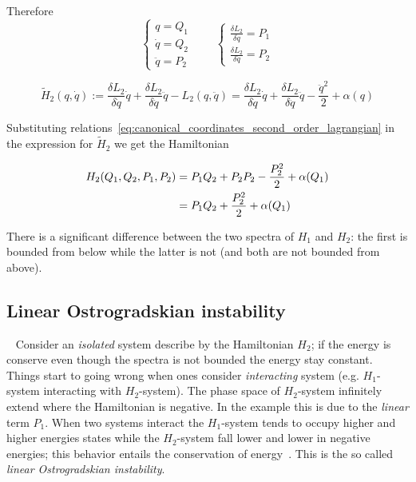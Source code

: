 Therefore
\begin{equation}\label{eq:canonical_coordinates_second_order_lagrangian}
  \begin{cases}
    q        = Q_1 \\
    \dot{q}  = Q_2 \\
    \ddot{q} = P_2
  \end{cases}
  \qquad
  \begin{cases}
    \frac{\delta L_2}{\delta \dot{q}}  = P_1 \\
    \frac{\delta L_2}{\delta \ddot{q}} = P_2
  \end{cases}
\end{equation}

\begin{equation*}
  \tilde{H}_2(q, \dot{q}) :=
    \frac{\delta L_2}{\delta \dot{q}} \dot{q} +
    \frac{\delta L_2}{\delta \ddot{q}} \ddot{q} -
    L_2(q, \ddot{q})
    = \frac{\delta L_2}{\delta \dot{q}} \dot{q} +
    \frac{\delta L_2}{\delta \ddot{q}} \ddot{q} -
    \frac{\ddot{q}^2}{2} + \alpha(q)
\end{equation*}

Substituting relations~\eqref{eq:canonical_coordinates_second_order_lagrangian}
in the expression for $\tilde{H}_2$ we get the Hamiltonian

\begin{align} \label{eq: second-order_motion_eq_ham}
  H_2(Q_1, Q_2, P_1, P_2)
    &= P_1 Q_2 + P_2 P_2 - \frac{P_2^2}{2} + \alpha(Q_1) \notag \\
    &= P_1 Q_2 + \frac{P_2^2}{2} + \alpha(Q_1)
\end{align}

There is a significant difference between the two spectra of $H_1$ and $H_2$:
the first is bounded from below while the latter is not (and both are not
bounded from above).


\subsection{Linear Ostrogradskian instability}~\label{subsection:
linear_ostrogradskian_instability}
Consider an \emph{isolated} system describe by the Hamiltonian $H_2$; if the
energy is conserve even though the spectra is not bounded the energy stay
constant. Things start to going wrong when ones consider \emph{interacting}
system (e.g. $H_1$-system interacting with $H_2$-system). The phase space of
$H_2$-system infinitely extend where the Hamiltonian is negative. In the example
this is due to the \emph{linear} term $P_1$. When two systems interact the
$H_1$-system tends to occupy higher and higher energies states while the
$H_2$-system fall lower and lower in negative energies; this behavior entails
the conservation of energy~\cite{Kallosh08, Eliezer89}.
This is the so called \emph{linear Ostrogradskian instability}. \\

